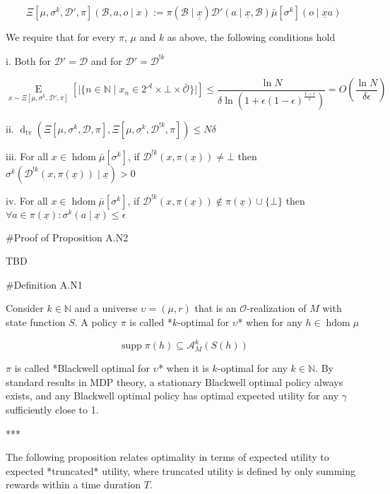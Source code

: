 \documentclass[a4paper]{article}
\DeclareMathOperator{\Supp}{supp}
\newcommand{\E}[1]{\underset{#1}{\operatorname{E}}}
\newcommand{\Dtv}{\operatorname{d}_{\text{tv}}}
\newcommand{\Nats}{\mathbb{N}}
\newcommand{\Abs}[1]{\lvert #1 \rvert}
\newcommand{\Ob}{\mathcal{O}}
\newcommand{\A}{\mathcal{A}}
\DeclareMathOperator{\HD}{hdom}
\newcommand{\D}{\mathcal{D}}
\newcommand{\B}{\mathcal{B}}
\begin{document}
$$\Xi\left[\mu,\sigma^k,\D',\pi\right]\left(\B,a,o \mid x\right):=\pi\left(\B \mid \underline{\underline{x}}\right)\D'\left(a \mid \underline{x},\B\right) \bar{\mu}[\sigma^k]\left(o \mid \underline{x}a\right)$$

We require that for every $\pi$, $\mu$ and $k$ as above, the following conditions hold

i. Both for $\D'=\D$ and for $\D'=\D^{!k}$

$$\E{x \sim\Xi\left[\mu,\sigma^k,\D',\pi\right]}\left[\Abs{\{n \in \Nats \mid x_n \in 2^\A \times \bot \times \bar{\Ob}\}}\right] \leq \frac{\ln N}{\delta \ln\left(1 + \epsilon(1-\epsilon)^{\frac{1-\epsilon}{\epsilon}}\right)}=O\left(\frac{\ln N}{\delta \epsilon}\right)$$

ii. $\Dtv\left(\Xi\left[\mu,\sigma^k,\D,\pi\right],\Xi\left[\mu,\sigma^k,\D^{!k},\pi\right]\right) \leq N\delta$

iii. For all $x \in \HD{\bar{\mu}[\sigma^k]}$, if $\D^{!k}\left(x,\pi\left(\underline{x}\right)\right) \ne \bot$ then $\sigma^k\left(\D^{!k}\left(x,\pi\left(\underline{x}\right)\right) \mid \underline{x}\right) > 0$

iv. For all $x \in \HD{\bar{\mu}[\sigma^k]}$, if $\D^{!k}\left(x,\pi\left(\underline{x}\right)\right) \not\in \pi\left(\underline{x}\right) \cup \{\bot\}$ then $\forall a \in \pi\left(\underline{x}\right): \sigma^k\left(a \mid \underline{x}\right) \leq \epsilon$

\#Proof of Proposition A.N2

TBD

\#Definition A.N1

Consider $k \in \Nats$ and a universe $\upsilon=(\mu,r)$ that is an $\Ob$-realization of $M$ with state function $S$. A policy $\pi$ is called *$k$-optimal for $\upsilon$* when for any $h \in \HD{\mu}$

$$\Supp \pi(h) \subseteq \A_M^k\left(S(h)\right)$$

$\pi$ is called *Blackwell optimal for $\upsilon$* when it is $k$-optimal for any $k \in \Nats$. By standard results in MDP theory, a stationary Blackwell optimal policy always exists, and any Blackwell optimal policy has optimal expected utility for any $\gamma$ sufficiently close to 1.

***

The following proposition relates optimality in terms of expected utility to expected *truncated* utility, where truncated utility is defined by only summing rewards within a time duration $T$.
\end{document}
